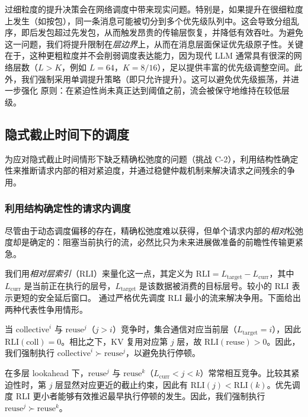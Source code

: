 过细粒度的提升决策会在网络调度中带来现实问题。特别是，如果提升在很细粒度上发生（如按包），同一条消息可能被切分到多个优先级队列中。这会导致分组乱序，即后发包超过先发包，从而触发昂贵的传输层恢复，并降低有效吞吐。为避免这一问题，我们将提升限制在\emph{层边界}上，从而在消息层面保证优先级原子性。关键在于，这种更粗粒度并不会削弱调度表达能力，因为现代 LLM 通常具有很深的网络层数（$L>K$，例如 $L=64$，$K=8/16$），足以提供丰富的优先级调整空间。此外，我们强制采用单调提升策略（即只允许提升）。这可以避免优先级振荡，并进一步强化 \DAP{} 原则：在紧迫性尚未真正达到阈值之前，流会被保守地维持在较低层级。

\subsection{隐式截止时间下的调度} \label{design:implicit}

为应对隐式截止时间情形下缺乏精确松弛度的问题（挑战 C-2），\sys 利用结构性确定性来推断请求内部的相对紧迫度，并通过稳健仲裁机制来解决请求之间残余的争用。

\subsubsection{利用结构确定性的请求内调度}\label{design:intrareq}

尽管由于动态调度偏移的存在，精确松弛度难以获得，但单个请求内部的\emph{相对}松弛度却是确定的：阻塞当前执行的流，必然比只为未来进展做准备的前瞻性传输更紧急。

我们用\emph{相对层索引}（RLI）来量化这一点，其定义为 $\text{RLI} = L_{\text{target}} - L_{\text{curr}}$，其中 $L_{\text{curr}}$ 是当前正在执行的层号，$L_{\text{target}}$ 是该数据被消费的目标层号。较小的 RLI 表示更短的安全延后窗口。\sys{} 通过严格优先调度 RLI 最小的流来解决争用。下面给出两种代表性争用情形。

 当 $\text{collective}^{i}$ 与 $\text{reuse}^{j}$（$j > i$）竞争时，集合通信对应当前层（$L_{\text{target}} = i$），因此 $\text{RLI}(\text{coll}) = 0$。相比之下，KV 复用对应第 $j$ 层，故 $\text{RLI}(\text{reuse}) > 0$。因此，我们强制执行 $\text{collective}^{i} \succ \text{reuse}^{j}$，以避免执行停顿。

 在多层 lookahead 下，$\text{reuse}^{j}$ 与 $\text{reuse}^{k}$（$L_{\text{curr}} < j < k$）常常相互竞争。比较其紧迫性时，第 $j$ 层显然对应更近的截止约束，因此有 $\text{RLI}(j) < \text{RLI}(k)$。优先调度 RLI 更小者能够有效推迟最早执行停顿的发生。因此，我们强制执行 $\text{reuse}^{j} \succ \text{reuse}^{k}$。

